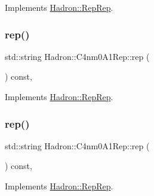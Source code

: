 Implements \mbox{\hyperlink{structHadron_1_1RepRep_ab3213025f6de249f7095892109575fde}{Hadron\+::\+Rep\+Rep}}.

\mbox{\label{structHadron_1_1C4nm0A1Rep_a5abe060187192307a0f68c3ac73704bc}} 
\subsubsection{\texorpdfstring{rep()}{rep()}\hspace{0.1cm}{\footnotesize\ttfamily [3/5]}}
{\footnotesize\ttfamily std\+::string Hadron\+::\+C4nm0\+A1\+Rep\+::rep (\begin{DoxyParamCaption}{ }\end{DoxyParamCaption}) const\hspace{0.3cm}{\ttfamily [inline]}, {\ttfamily [virtual]}}



Implements \mbox{\hyperlink{structHadron_1_1RepRep_ab3213025f6de249f7095892109575fde}{Hadron\+::\+Rep\+Rep}}.

\mbox{\label{structHadron_1_1C4nm0A1Rep_a5abe060187192307a0f68c3ac73704bc}} 
\subsubsection{\texorpdfstring{rep()}{rep()}\hspace{0.1cm}{\footnotesize\ttfamily [4/5]}}
{\footnotesize\ttfamily std\+::string Hadron\+::\+C4nm0\+A1\+Rep\+::rep (\begin{DoxyParamCaption}{ }\end{DoxyParamCaption}) const\hspace{0.3cm}{\ttfamily [inline]}, {\ttfamily [virtual]}}



Implements \mbox{\hyperlink{structHadron_1_1RepRep_ab3213025f6de249f7095892109575fde}{Hadron\+::\+Rep\+Rep}}.

\mbox{\label{structHadron_1_1C4nm0A1Rep_a5abe060187192307a0f68c3ac73704bc}} 
